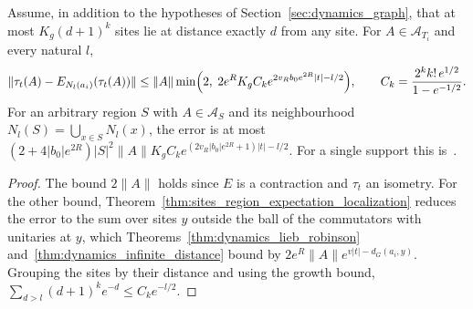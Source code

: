 \begin{theorem}
    \label{thm:dynamics_localization}
    \leanok
    Assume, in addition to the hypotheses of
    Section~\ref{sec:dynamics_graph}, that at most $K_g(d+1)^k$ sites lie at
    distance exactly $d$ from any site. For $A\in\mathcal A_{T_i}$ and every
    natural $l$,
    \begin{align*}
        \lVert\tau_t(A)-E_{N_l(a_i)}(\tau_t(A))\rVert
            \leq\lVert A\rVert\min\Bigl(2,\;2e^RK_gC_k
                e^{2v_Rb_0e^{2R}|t|-l/2}\Bigr),
        \qquad C_k=\frac{2^kk!\,e^{1/2}}{1-e^{-1/2}}.
    \end{align*}
    For an arbitrary region $S$ with $A\in\mathcal A_S$ and its neighbourhood
    $N_l(S)=\bigcup_{x\in S}N_l(x)$, the error is at most
    $(2+4|b_0|e^{2R})|S|^2\lVert A\rVert K_gC_k
    e^{(2v_R|b_0|e^{2R}+1)|t|-l/2}$.
    For a single support this is~\cite[Lemma~4.1]{OpenAI2026AreaLaw}.
\end{theorem}
\begin{proof}\leanok
    The bound $2\lVert A\rVert$ holds since $E$ is a contraction and $\tau_t$ an
    isometry. For the other bound, Theorem~\ref{thm:sites_region_expectation_localization}
    reduces the error to the sum over sites $y$ outside the ball of the
    commutators with unitaries at $y$, which
    Theorems~\ref{thm:dynamics_lieb_robinson}
    and~\ref{thm:dynamics_infinite_distance} bound by
    $2e^R\lVert A\rVert e^{v|t|-d_G(a_i,y)}$. Grouping the sites by their
    distance and using the growth bound,
    $\sum_{d>l}(d+1)^ke^{-d}\leq C_ke^{-l/2}$.
\end{proof}

